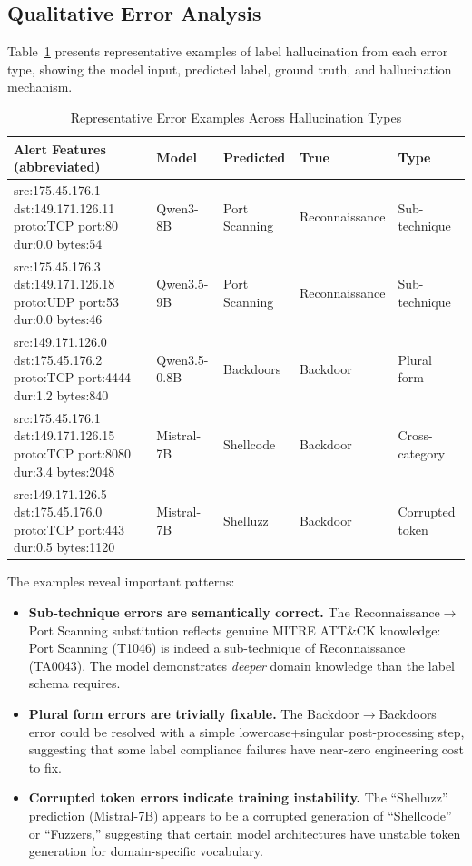 \documentclass[journal]{IEEEtran}
\begin{document}
\subsection{Qualitative Error Analysis}

Table~\ref{tab:examples} presents representative examples of label hallucination from each error type, showing the model input, predicted label, ground truth, and hallucination mechanism.

\begin{table}[t]
\centering
\caption{Representative Error Examples Across Hallucination Types}
\label{tab:examples}
\begin{tabular}{p{4.5cm}llll}
\toprule
\textbf{Alert Features (abbreviated)} & \textbf{Model} & \textbf{Predicted} & \textbf{True} & \textbf{Type} \\
\midrule
src:175.45.176.1 dst:149.171.126.11 proto:TCP port:80 dur:0.0 bytes:54 & Qwen3-8B & Port Scanning & Reconnaissance & Sub-technique \\
\midrule
src:175.45.176.3 dst:149.171.126.18 proto:UDP port:53 dur:0.0 bytes:46 & Qwen3.5-9B & Port Scanning & Reconnaissance & Sub-technique \\
\midrule
src:149.171.126.0 dst:175.45.176.2 proto:TCP port:4444 dur:1.2 bytes:840 & Qwen3.5-0.8B & Backdoors & Backdoor & Plural form \\
\midrule
src:175.45.176.1 dst:149.171.126.15 proto:TCP port:8080 dur:3.4 bytes:2048 & Mistral-7B & Shellcode & Backdoor & Cross-category \\
\midrule
src:149.171.126.5 dst:175.45.176.0 proto:TCP port:443 dur:0.5 bytes:1120 & Mistral-7B & Shelluzz & Backdoor & Corrupted token \\
\bottomrule
\end{tabular}
\end{table}

The examples reveal important patterns:
\begin{itemize}
\item \textbf{Sub-technique errors are semantically correct.} The Reconnaissance$\to$Port Scanning substitution reflects genuine MITRE ATT\&CK knowledge: Port Scanning (T1046) is indeed a sub-technique of Reconnaissance (TA0043). The model demonstrates \emph{deeper} domain knowledge than the label schema requires.
\item \textbf{Plural form errors are trivially fixable.} The Backdoor$\to$Backdoors error could be resolved with a simple lowercase+singular post-processing step, suggesting that some label compliance failures have near-zero engineering cost to fix.
\item \textbf{Corrupted token errors indicate training instability.} The ``Shelluzz'' prediction (Mistral-7B) appears to be a corrupted generation of ``Shellcode'' or ``Fuzzers,'' suggesting that certain model architectures have unstable token generation for domain-specific vocabulary.
\end{itemize}
\end{document}
